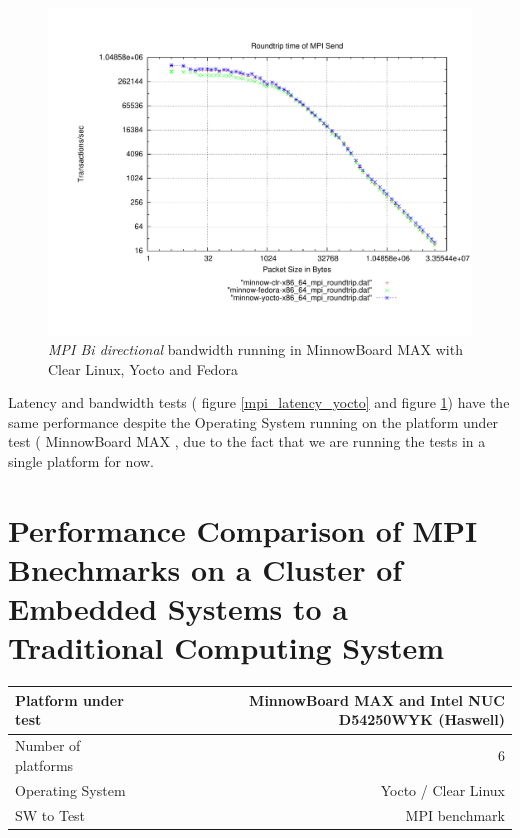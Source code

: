 \begin{figure}[H]
\centering
\includegraphics[width=1 \textwidth]{images/mpbench_yocto_experiments/mpi_roundtrip.pdf}
\caption{\textit{MPI Bi directional} bandwidth running in  MinnowBoard MAX  with Clear Linux,
Yocto and Fedora }
\label{mpi_roundtrip_yocto}
\end{figure}

Latency and bandwidth tests ( figure \ref{mpi_latency_yocto} and figure
\ref{mpi_roundtrip_yocto}) have the same performance despite the Operating
System running on the platform under test (  MinnowBoard MAX  , due to the fact
that we are running the tests in a single platform for now.


\section{Performance Comparison of MPI Bnechmarks on a Cluster of Embedded
Systems to a Traditional Computing System}

    \begin{center}
    \begin{tabular}{ | l | r |}
        \hline
        Platform under test &  MinnowBoard MAX  and Intel NUC D54250WYK
        (Haswell)\\ \hline
        Number of platforms  & 6  \\ \hline
        Operating System & Yocto / Clear Linux  \\ \hline
        SW to Test & MPI benchmark \\ \hline
    \end{tabular}
    \end{center}


